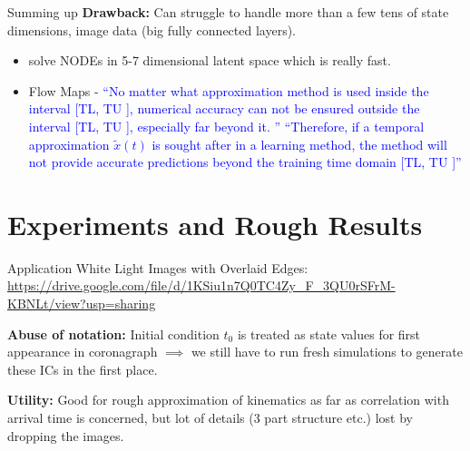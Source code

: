 \documentclass[usenames,dvipsnames]{beamer}
\theoremstyle{definition}
\let\oldcite=\cite
\renewcommand{\cite}[2][]{\textcolor{green}{\oldcite[#1]{#2}}}
\begin{document}
\begin{frame}{Summing up}
    \textbf{Drawback:}
    Can struggle to handle more than a few tens of state dimensions, image data (big fully connected layers).

    \begin{itemize}
        \item \cite{lee_parameterized_2021} solve NODEs in 5-7 dimensional latent space which is really fast.
        
        \item Flow Maps - \textcolor{blue}{``No matter
        what approximation method is used inside the interval [TL, TU ], numerical accuracy
        can not be ensured outside the interval [TL, TU ], especially far beyond it. ''}
        \textcolor{blue}{``Therefore, if
        a temporal approximation $\tilde{x}(t)$ is sought after in a learning method, the method will not provide accurate predictions beyond the training time domain [TL, TU ]''}
    \end{itemize}
\end{frame}

\section{Experiments and Rough Results}


    

\begin{frame}{Application}
    White Light Images with Overlaid Edges: \url{https://drive.google.com/file/d/1KSiu1n7Q0TC4Zy_F_3QU0rSFrM-KBNLt/view?usp=sharing}

    \textbf{Abuse of notation:} Initial condition $t_0$ is treated as state values for first appearance in coronagraph $\implies$ we still have to run fresh simulations to generate these ICs in the first place.

    \textbf{Utility: } Good for rough approximation of kinematics as far as correlation with arrival time is concerned, but lot of details (3 part structure etc.) lost by dropping the images.

    
\end{frame}
\end{document}
